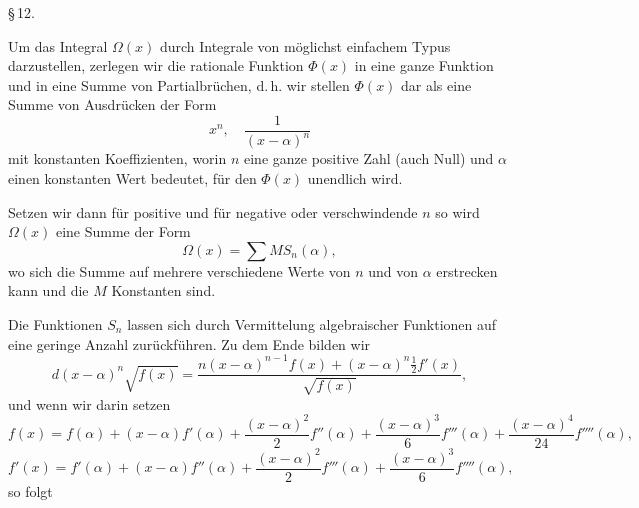 \begin{center}
\S\,12. \\
\end{center}
Um das Integral $\Omega(x)$ durch Integrale von möglichst einfachem Typus darzustellen, zerlegen wir die rationale Funktion $\Phi(x)$ in eine ganze Funktion und in eine Summe von Partialbrüchen, d.\,h. wir stellen $\Phi(x)$ dar als eine Summe von Ausdrücken der Form
\[
x^n, \quad \frac{1}{(x-\alpha)^n}
\]
mit konstanten Koeffizienten, worin $n$ eine ganze positive Zahl (auch Null) und $\alpha$ einen konstanten Wert bedeutet, für den $\Phi(x)$ unendlich wird.

Setzen wir dann für positive und für negative oder verschwindende $n$
so wird $\Omega(x)$ eine Summe der Form
\[
\Omega(x) = \sum M S_n(\alpha),
\]
wo sich die Summe auf mehrere verschiedene Werte von $n$ und von $\alpha$ erstrecken kann und die $M$ Konstanten sind.

Die Funktionen $S_n$ lassen sich durch Vermittelung algebraischer Funktionen auf eine geringe Anzahl zurückführen. Zu dem Ende bilden wir
\[
d(x-\alpha)^n\sqrt{f(x)} = \frac{n(x-\alpha)^{n-1}f(x) + (x-\alpha)^n\frac{1}{2}f'(x)}{\sqrt{f(x)}},
\]
und wenn wir darin setzen
\[
f(x) = f(\alpha) + (x-\alpha)f'(\alpha) + \frac{(x-\alpha)^2}{2}f''(\alpha) + \frac{(x-\alpha)^3}{6}f'''(\alpha) + \frac{(x-\alpha)^4}{24}f''''(\alpha),
\]
\[
f'(x) = f'(\alpha) + (x-\alpha)f''(\alpha) + \frac{(x-\alpha)^2}{2}f'''(\alpha) + \frac{(x-\alpha)^3}{6}f''''(\alpha),
\]
so folgt
